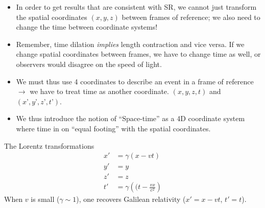 \documentclass[aspectratio=169,
hyperref={colorlinks,urlcolor=blue}
]{beamer}
\begin{document}
{
\begin{itemize}
\item In order to get results that are consistent with SR, we cannot just transform the spatial coordinates $(x,y,z)$ between frames of reference; we also need to change the time between coordinate systems! 
\item Remember, time dilation \textit{implies} length contraction and vice versa. If we change spatial coordinates between frames, we have to change time as well, or observers would disagree on the speed of light.
\item We must thus use 4 coordinates to describe an event in a frame of reference $\rightarrow$ we have to treat time as another coordinate. $(x,y,z,t)$ and $(x’,y’,z’,t’)$.
\item We thus introduce the notion of ``Space-time'' as a 4D coordinate system where time in on “equal footing” with the spatial coordinates.
\end{itemize}
}
{
\begin{block}{The Lorentz transformations}
\begin{align*}
x'&=\gamma(x-vt)\\
y'&=y\\
z'&=z\\
t'&=\gamma\left((t-\frac{vx}{c^2}\right)
\end{align*}
When $v$ is small ($\gamma\sim 1$), one recovers Galilean relativity ($x'=x-vt$, $t'=t$).
\end{block}
}

\end{document}
